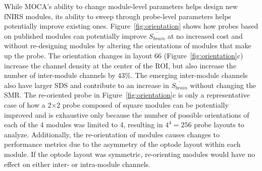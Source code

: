 While \ac{MOCA}'s ability to change module-level parameters helps design new \ac{fNIRS} modules, its ability to sweep through probe-level parameters helps potentially improve existing ones. Figure~\ref{fig:orientation} shows how probes based on published modules can potentially improve $\overline{S_{brain}}$ at no increased cost and without re-designing modules by altering the orientations of modules that make up the probe. The orientation changes in layout 66 (Figure~\ref{fig:orientation}c) increase the channel density at the center of the \ac{ROI}, but also increase the number of inter-module channels by 43\%. The emerging inter-module channels also have larger \ac{SDS} and contribute to an increase in $\overline{S_{brain}}$ without changing the \ac{SMR}. The re-oriented probe in Figure~\ref{fig:orientation}c is only a representative case of how a 2$\times$2 probe composed of square modules can be potentially improved and is exhaustive only because the number of possible orientations of each of the 4 modules was limited to 4, resulting in $4^4=256$ probe layouts to analyze. Additionally, the re-orientation of modules causes changes to performance metrics due to the asymmetry of the optode layout within each module. If the optode layout was symmetric, re-orienting modules would have no effect on either inter- or intra-module channels. 

